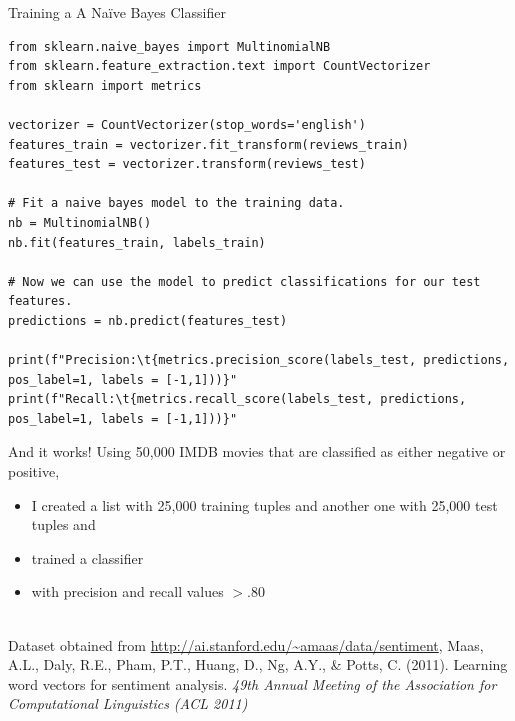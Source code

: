 \documentclass[compress]{beamer}
\begin{document}
\begin{frame}[fragile]{Training a A Naïve Bayes Classifier}
  \begin{lstlisting}
from sklearn.naive_bayes import MultinomialNB
from sklearn.feature_extraction.text import CountVectorizer
from sklearn import metrics

vectorizer = CountVectorizer(stop_words='english')
features_train = vectorizer.fit_transform(reviews_train)
features_test = vectorizer.transform(reviews_test)

# Fit a naive bayes model to the training data.
nb = MultinomialNB()
nb.fit(features_train, labels_train)

# Now we can use the model to predict classifications for our test features.
predictions = nb.predict(features_test)

print(f"Precision:\t{metrics.precision_score(labels_test, predictions, pos_label=1, labels = [-1,1]))}"
print(f"Recall:\t{metrics.recall_score(labels_test, predictions, pos_label=1, labels = [-1,1]))}"
\end{lstlisting}
\end{frame}
%


\begin{frame}{And it works!}
	Using 50,000 IMDB movies that are classified as either negative or positive,
	\begin{itemize}
		\item I created a list with 25,000 training tuples and another one with 25,000 test tuples and
		\item trained a classifier
		\item with precision and recall values $>.80$
	\end{itemize}
	~\\
	\tiny{Dataset obtained from \url{http://ai.stanford.edu/~amaas/data/sentiment}, Maas, A.L., Daly, R.E., Pham, P.T., Huang, D., Ng, A.Y., \& Potts, C. (2011). Learning word vectors for sentiment analysis. \emph{49th Annual Meeting of the Association for Computational Linguistics (ACL 2011)}
	}
	
\end{frame}
\end{document}
